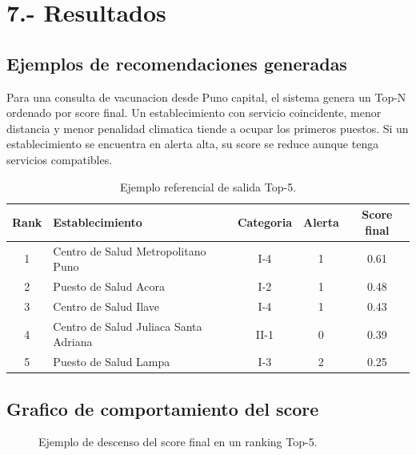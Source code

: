 \documentclass[12pt,a4paper]{article}
\begin{document}
\section{7.- Resultados}
\subsection{Ejemplos de recomendaciones generadas}
Para una consulta de vacunacion desde Puno capital, el sistema genera un Top-N ordenado por score final. Un establecimiento con servicio coincidente, menor distancia y menor penalidad climatica tiende a ocupar los primeros puestos. Si un establecimiento se encuentra en alerta alta, su score se reduce aunque tenga servicios compatibles.

\begin{table}[H]
\centering
\caption{Ejemplo referencial de salida Top-5.}
\label{tab:top5}
\small
\begin{tabular}{clccc}
\toprule
Rank & Establecimiento & Categoria & Alerta & Score final \\
\midrule
1 & Centro de Salud Metropolitano Puno & I-4 & 1 & 0.61 \\
2 & Puesto de Salud Acora & I-2 & 1 & 0.48 \\
3 & Centro de Salud Ilave & I-4 & 1 & 0.43 \\
4 & Centro de Salud Juliaca Santa Adriana & II-1 & 0 & 0.39 \\
5 & Puesto de Salud Lampa & I-3 & 2 & 0.25 \\
\bottomrule
\end{tabular}
\end{table}

\subsection{Grafico de comportamiento del score}
\begin{figure}[H]
\centering
{}
\caption{Ejemplo de descenso del score final en un ranking Top-5.}
\label{fig:score}
\end{figure}
\end{document}
